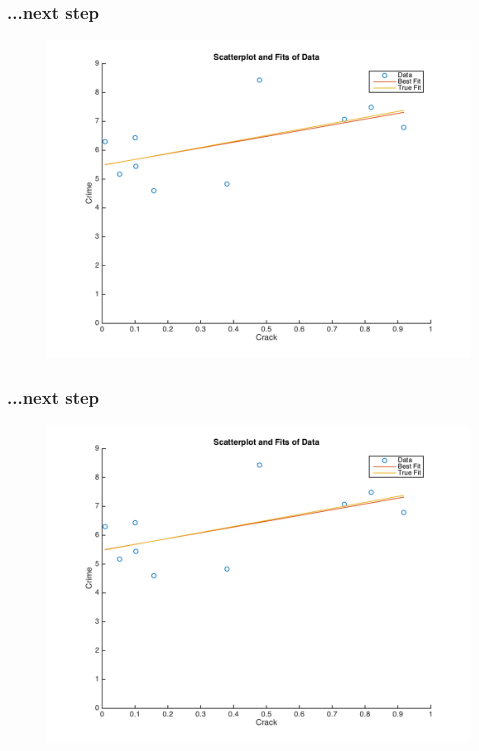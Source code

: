 \documentclass{beamer}
\begin{document}
\begin{frame}
\frametitle[alignment=center]{...next step}
\begin{figure}
\centering
\includegraphics[scale=0.5]{Newton_OLS_Figure_24.png}
\end{figure}
\end{frame}

\begin{frame}
\frametitle[alignment=center]{...next step}
\begin{figure}
\centering
\includegraphics[scale=0.5]{Newton_OLS_Figure_25.png}
\end{figure}
\end{frame}
\end{document}
